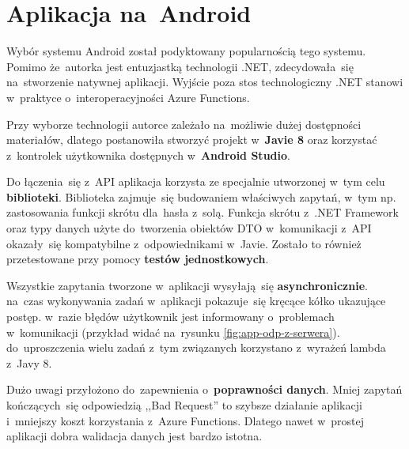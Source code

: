 \documentclass[12pt,a4paper,twoside,titlepage,openright]{book}
\begin{document}
\section{Aplikacja na~Android}

Wybór systemu Android został podyktowany popularnością tego systemu. Pomimo że~autorka jest entuzjastką technologii .NET, zdecydowała~się na~stworzenie natywnej aplikacji. Wyjście poza stos technologiczny .NET stanowi w~praktyce o~interoperacyjności Azure Functions.

Przy wyborze technologii autorce zależało na~możliwie dużej dostępności materiałów, dlatego postanowiła stworzyć projekt w~\textbf{Javie 8} oraz korzystać z~kontrolek użytkownika dostępnych w~\textbf{Android Studio}. 

Do łączenia~się z~API aplikacja korzysta ze specjalnie utworzonej w~tym celu \textbf{biblioteki}. Biblioteka zajmuje~się budowaniem właściwych zapytań, w~tym np. zastosowania funkcji skrótu dla~hasła z~solą. Funkcja skrótu z~.NET Framework oraz typy danych użyte do~tworzenia obiektów DTO w~komunikacji z~API okazały~się kompatybilne z~odpowiednikami w~Javie. Zostało to również przetestowane przy pomocy \textbf{testów jednostkowych}.

Wszystkie zapytania tworzone w~aplikacji wysyłają~się \textbf{asynchronicznie}. na~czas wykonywania zadań w~aplikacji pokazuje~się kręcące kółko ukazujące postęp. w~razie błędów użytkownik jest informowany o~problemach w~komunikacji (przykład widać na~rysunku \ref{fig:app-odp-z-serwera}). do~uproszczenia wielu zadań z~tym związanych korzystano z~wyrażeń lambda z~Javy 8.

Dużo uwagi przyłożono do~zapewnienia o~\textbf{poprawności danych}. Mniej zapytań kończących~się odpowiedzią ,,Bad Request'' to szybsze działanie aplikacji i~mniejszy koszt korzystania z~Azure Functions. Dlatego nawet w~prostej aplikacji dobra walidacja danych jest bardzo istotna.
\end{document}
